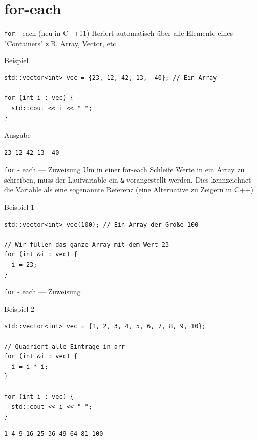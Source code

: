 \documentclass[presentation]{beamer}
\begin{document}
\section{for-each}
\label{sec:org7d98078}
\begin{frame}[fragile,label={sec:orgfcb0c92}]{{\color{solarizedYellow}\texttt{for} }- each (neu in C++11)}
 Iteriert automatisch über alle Elemente eines "Containers" z.B. Array,
Vector, etc.
\begin{block}{Beispiel}
\begin{verbatim}
std::vector<int> vec = {23, 12, 42, 13, -40}; // Ein Array

for (int i : vec) {
  std::cout << i << " ";
}
\end{verbatim}
\end{block}
\begin{block}{Ausgabe}
\begin{verbatim}
23 12 42 13 -40
\end{verbatim}
\end{block}
\end{frame}
\begin{frame}[fragile,label={sec:org0bcd8ed}]{{\color{solarizedYellow}\texttt{for} }- each --- Zuweisung}
 Um in einer for-each Schleife Werte in ein Array zu schreiben, muss
der Laufvariable ein {\color{solarizedYellow}\texttt{\&} }vorangestellt werden. Dies kennzeichnet die
Variable als eine sogenannte \alert{Referenz} (eine Alternative zu Zeigern
in C++)
\begin{block}{Beispiel 1}
\begin{verbatim}
std::vector<int> vec(100); // Ein Array der Größe 100

// Wir füllen das ganze Array mit dem Wert 23
for (int &i : vec) {
  i = 23;
}
\end{verbatim}
\end{block}
\end{frame}
\begin{frame}[fragile,label={sec:orgc3d4eb9}]{{\color{solarizedYellow}\texttt{for} }- each --- Zuweisung}
 \begin{block}{Beispiel 2}
\begin{verbatim}
std::vector<int> vec = {1, 2, 3, 4, 5, 6, 7, 8, 9, 10};

// Quadriert alle Einträge in arr
for (int &i : vec) {
  i = i * i;
}

for (int i : vec) {
  std::cout << i << " ";
}
\end{verbatim}

\begin{verbatim}
1 4 9 16 25 36 49 64 81 100
\end{verbatim}
\end{block}
\end{frame}
\end{document}
